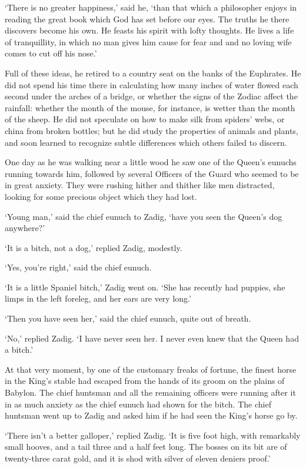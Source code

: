 \documentclass{article}
\begin{document}
\begin{center}
`There is no greater happiness,' said he, `than that which a philosopher enjoys 
in reading the great book which God has set before our eyes. The truths he there 
discovers become his own. He feasts his spirit with lofty thoughts. He lives a 
life of tranquillity, in which no man gives him cause for fear and and no loving 
wife comes to cut off his nose.' 

Full of these ideas, he retired to a country seat on the banks of the Euphrates. 
He did not spend his time there in calculating how many inches of water flowed 
each second under the arches of a bridge, or whether the signs of the Zodiac affect 
the rainfall: whether the month of the mouse, for instance, is wetter than the 
month of the sheep. He did not speculate on how to make silk from spiders' webs, 
or china from broken bottles; but he did study the properties of animals and plants, 
and soon learned to recognize subtle differences which others failed to discern. 

One day as he was walking near a little wood he saw one of the Queen's eunuchs 
running towards him, followed by several Officers of the Guard who seemed to be 
in great anxiety. They were rushing hither and thither like men distracted, looking 
for some precious object which they had lost. 

`Young man,' said the chief eunuch to Zadig, `have you seen the Queen's dog anywhere?' 

`It is a bitch, not a dog,' replied Zadig, modestly. 

`Yes, you're right,' said the chief eunuch. 

`It is a little Spaniel bitch,' Zadig went on. `She has recently had puppies, she 
limps in the left foreleg, and her ears are very long.' 

`Then you have seen her,' said the chief eunuch, quite out of breath. 

`No,' replied Zadig. `I have never seen her. I never even knew that the Queen had 
a bitch.' 

At that very moment, by one of the customary freaks of fortune, the finest horse 
in the King's stable had escaped from the hands of its groom on the plains of Babylon. 
The chief huntsman and all the remaining officers were running after it in as much 
anxiety as the chief eunuch had shown for the bitch. The chief huntsman went up 
to Zadig and asked him if he had seen the King's horse go by. 

`There isn't a better galloper,' replied Zadig. `It is five foot high, with remarkably 
small hooves, and a tail three and a half feet long. The bosses on its bit are 
of twenty-three carat gold, and it is shod with silver of eleven deniers proof.' 


\end{center}
\end{document}

